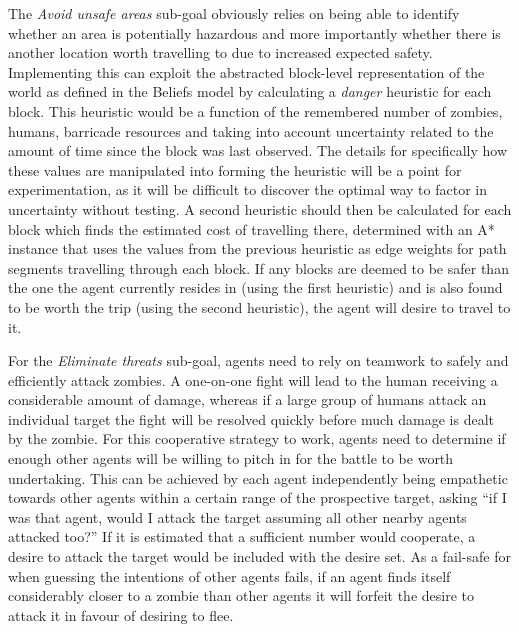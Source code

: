 \documentclass[12pt,a4paper]{article}
\begin{document}
The \emph{Avoid unsafe areas} sub-goal obviously relies on being able to identify whether an area is potentially hazardous and more importantly whether there is another location worth travelling to due to increased expected safety. Implementing this can exploit the abstracted block-level representation of the world as defined in the Beliefs model by calculating a \emph{danger} heuristic for each block. This heuristic would be a function of the remembered number of zombies, humans, barricade resources and taking into account uncertainty related to the amount of time since the block was last observed. The details for specifically how these values are manipulated into forming the heuristic will be a point for experimentation, as it will be difficult to discover the optimal way to factor in uncertainty without testing. A second heuristic should then be calculated for each block which finds the estimated cost of travelling there, determined with an A* instance that uses the values from the previous heuristic as edge weights for path segments travelling through each block. If any blocks are deemed to be safer than the one the agent currently resides in (using the first heuristic) and is also found to be worth the trip (using the second heuristic), the agent will desire to travel to it.

For the \emph{Eliminate threats} sub-goal, agents need to rely on teamwork to safely and efficiently attack zombies. A one-on-one fight will lead to the human receiving a considerable amount of damage, whereas if a large group of humans attack an individual target the fight will be resolved quickly before much damage is dealt by the zombie. For this cooperative strategy to work, agents need to determine if enough other agents will be willing to pitch in for the battle to be worth undertaking. This can be achieved by each agent independently being empathetic towards other agents within a certain range of the prospective target, asking ``if I was that agent, would I attack the target assuming all other nearby agents attacked too?'' If it is estimated that a sufficient number would cooperate, a desire to attack the target would be included with the desire set. As a fail-safe for when guessing the intentions of other agents fails, if an agent finds itself considerably closer to a zombie than other agents it will forfeit the desire to attack it in favour of desiring to flee.
\end{document}
